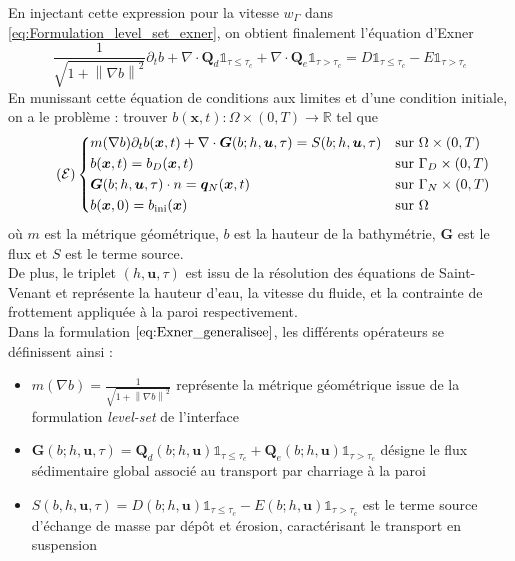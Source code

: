 \documentclass[11pt, a4paper, oneside]{report}
\begin{document}
\noindent
En injectant cette expression pour la vitesse $w_\Gamma$ dans \eqref{eq:Formulation_level_set_exner}, on obtient finalement l'équation d'Exner
\begin{equation}
    \frac{1}{\sqrt{1 + \left\| \nabla b \right\|^2}} \partial_t b + \nabla \cdot \bm{Q}_d \mathds{1}_{\tau \leq \tau_c} + \nabla \cdot \bm{Q}_e \mathds{1}_{\tau > \tau_c} = D \mathds{1}_{\tau \leq \tau_c} - E \mathds{1}_{\tau > \tau_c}
\end{equation}
En munissant cette équation de conditions aux limites et d'une condition initiale, on a le problème : trouver $b(\bm{x}, t) : \Omega \times (0, T) \longrightarrow \mathbb{R}$ tel que
\begin{equation} \tag{$\mathcal{E}$} \label{eq:Exner_generalisee}
    \left \{
    \begin{aligned}
        &m(\nabla b) \partial_t b(\bm{x}, t) + \nabla \cdot \bm{G}(b; h, \bm{u}, \tau) = S(b; h, \bm{u}, \tau)  &&\text{sur } \Omega \times (0, T) \\
        &b(\bm{x}, t) = b_D(\bm{x}, t)    &&\text{sur } \Gamma_D \times (0, T) \\
        &\bm{G}(b; h, \bm{u}, \tau) \cdot n = \bm{q}_N(\bm{x}, t)  &&\text{sur } \Gamma_N \times (0, T) \\
        &b(\bm{x}, 0) = b_\text{ini}(\bm{x})  &&\text{sur } \Omega
    \end{aligned}
    \right .
\end{equation}
où $m$ est la métrique géométrique, $b$ est la hauteur de la bathymétrie, $\bm{G}$ est le flux et $S$ est le terme source. \\
De plus, le triplet $(h, \bm{u}, \tau)$ est issu de la résolution des équations de Saint-Venant et représente la hauteur d'eau, la vitesse du fluide, et la contrainte de frottement appliquée à la paroi respectivement. \\
Dans la formulation $\eqref{eq:Exner_generalisee}$, les différents opérateurs se définissent ainsi :
\begin{itemize}
    \item $\displaystyle m(\nabla b) = \frac{1}{\sqrt{1 + \left\| \nabla b \right\|^2}}$ représente la métrique géométrique issue de la formulation \textit{level-set} de l'interface
    \item $\displaystyle \bm{G}(b; h, \bm{u}, \tau) = \bm{Q}_d(b; h, \bm{u}) \mathds{1}_{\tau \leq \tau_c} + \bm{Q}_e(b; h, \bm{u}) \mathds{1}_{\tau > \tau_c}$ désigne le flux sédimentaire global associé au transport par charriage à la paroi
    \item $\displaystyle S(b, h, \bm{u}, \tau) = D(b; h, \bm{u}) \mathds{1}_{\tau \leq \tau_c} - E(b; h, \bm{u}) \mathds{1}_{\tau > \tau_c}$ est le terme source d'échange de masse par dépôt et érosion, caractérisant le transport en suspension
\end{itemize}
\end{document}
